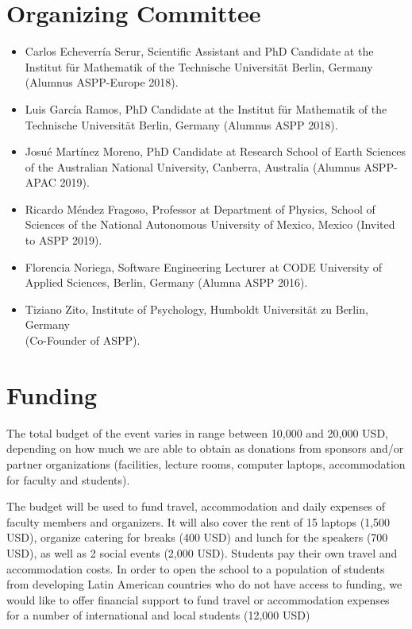 \documentclass{article}[11pt]
\begin{document}
\section*{Organizing Committee}
\begin{itemize}
\item Carlos Echeverr\'ia Serur, Scientific Assistant and PhD Candidate at the
Institut f\"ur Mathematik of the Technische Universit\"at Berlin, Germany
(Alumnus ASPP-Europe 2018).

\item Luis Garc\'ia Ramos, PhD Candidate at the Institut f\"ur Mathematik
of the Technische Universit\"at Berlin, Germany (Alumnus ASPP 2018).

\item Josu\'e Mart\'inez Moreno, PhD Candidate at Research School of Earth
Sciences of the Australian National University, Canberra, Australia (Alumnus
ASPP-APAC 2019).

\item Ricardo M\'endez Fragoso, Professor at Department of Physics, School
of Sciences of the National Autonomous University of Mexico, Mexico (Invited to
ASPP 2019).

\item Florencia Noriega, Software Engineering Lecturer at CODE University
of Applied Sciences, Berlin, Germany (Alumna ASPP 2016).

\item Tiziano Zito, Institute of Psychology, Humboldt Universit\"at zu Berlin,
Germany\\ (Co-Founder of ASPP).
\end{itemize}

\section*{Funding}
The total budget of the event varies in range between 10,000 and 20,000 USD,
depending on how much we are able to obtain as donations from sponsors and/or
partner organizations (facilities, lecture rooms, computer laptops,
accommodation for faculty and students).

The budget will be used to fund travel, accommodation and daily expenses of
faculty members and organizers. It will also cover the rent of 15 laptops
(1,500 USD), organize catering for breaks (400 USD) and lunch for the speakers
(700 USD), as well as 2 social events (2,000 USD). Students pay their own
travel and accommodation costs. In order to open the school to a population of
students from developing Latin American countries who do not have access to
funding, we would like to offer financial support to fund travel or
accommodation expenses for a number of international and local students (12,000
USD)
\end{document}
